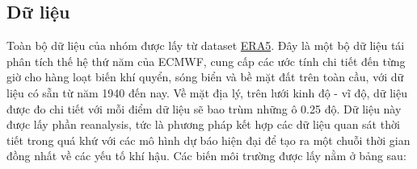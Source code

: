\documentclass[12pt,a4paper]{article}
\begin{document}
\subsection{Dữ liệu}

Toàn bộ dữ liệu của nhóm được lấy từ dataset \href{https://cds.climate.copernicus.eu/datasets/reanalysis-era5-single-levels?tab=overview}{ERA5}. Đây là một bộ dữ liệu tái phân tích thế hệ thứ năm của ECMWF, cung cấp các ước tính chi tiết đến từng giờ cho hàng loạt biến khí quyển, sóng biển và bề mặt đất trên toàn cầu, với dữ liệu có sẵn từ năm 1940 đến nay. Về mặt địa lý, trên lưới kinh độ - vĩ độ, dữ liệu được đo chi tiết với mỗi điểm dữ liệu sẽ bao trùm những ô 0.25 độ. Dữ liệu này được lấy phần reanalysis, tức là phương pháp kết hợp các dữ liệu quan sát thời tiết trong quá khứ với các mô hình dự báo hiện đại để tạo ra một chuỗi thời gian đồng nhất về các yếu tố khí hậu. Các biến môi trường được lấy nằm ở bảng sau:
\end{document}

